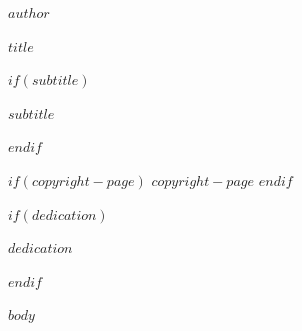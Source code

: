 \documentclass[10pt,twoside]{book}
\begin{document}
\begin{titlepage}
\thispagestyle{empty}

\vspace*{0.25\textheight}

\begin{center}

{\Large $author$ \par}

\vspace{25pt}

{\LARGE $title$ \par}
\vspace{18pt}

$if(subtitle)$
{\itshape
$subtitle$
\par}
$endif$

\end{center}

\vfill

\end{titlepage}

\clearpage
\thispagestyle{empty}

\vspace*{0.22\textheight}

\begin{center}
\itshape
\setlength{\parindent}{0pt}
\setlength{\parskip}{0.9\baselineskip}

$if(copyright-page)$
$copyright-page$
$endif$

\end{center}

$if(dedication)$
\clearpage
\thispagestyle{empty}

\vspace*{0.30\textheight}

\begin{center}
\itshape
$dedication$
\end{center}

\clearpage
$endif$

$body$
\end{document}
